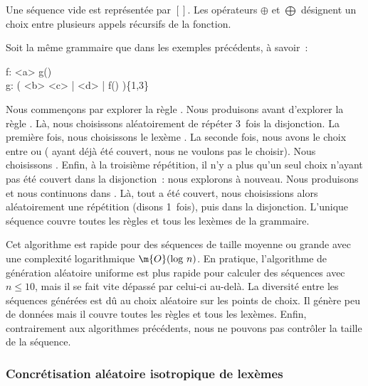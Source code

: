 Une séquence vide est représentée par $[]$. Les opérateurs $\oplus$ et
$\bigoplus$ désignent un choix entre plusieurs appels récursifs de la fonction.

\begin{example}
\label{example:data:coverage_based_generation}

Soit la même grammaire que dans les exemples précédents, à savoir~:

\begin{pre}
f: <a> g() \\
g: ( <b> <c> | <d> | f() )\{1,3\}
\end{pre}

Nous commençons par explorer la règle . Nous produisons  avant
d'explorer la règle . Là, nous choisissons aléatoirement de répéter
3~fois la disjonction. La première fois, nous choisissons le lexème .
La seconde fois, nous avons le choix entre  ou 
( ayant déjà été couvert, nous ne voulons pas le choisir). Nous
choisissons . Enfin, à la troisième répétition, il n'y a plus
qu'un seul choix n'ayant pas été couvert dans la disjonction~: nous explorons
 à nouveau. Nous produisons  et nous continuons dans .
Là, tout a été couvert, nous choisissions alors aléatoirement une répétition
(disons 1~fois), puis  dans la disjonction. L'unique séquence
 couvre toutes les règles et tous les lexèmes de
la grammaire.

\end{example}

Cet algorithme est rapide pour des séquences de taille moyenne ou grande avec
une complexité logarithmique $\m{O}(\mathrm{log}~n)$. En pratique, l'algorithme
de génération aléatoire uniforme est plus rapide pour calculer des séquences
avec $n \leq 10$, mais il se fait vite dépassé par celui-ci au-delà. La
diversité entre les séquences générées est dû au choix aléatoire sur les points
de choix. Il génère peu de données mais il couvre toutes les règles et tous les
lexèmes. Enfin, contrairement aux algorithmes précédents, nous ne pouvons pas
contrôler la taille de la séquence.

\subsubsection{Concrétisation aléatoire isotropique de lexèmes}
\label{subsection:data:isotropic_generation}

